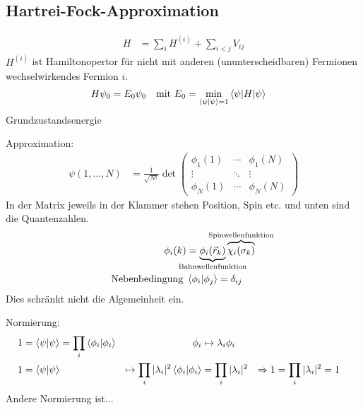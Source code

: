 \subsection{Hartrei-Fock-Approximation}
	\begin{align*}
		H &= \sum_i H^{(i)} + \sum_{i<j} V_{ij}
	\end{align*}
$H^{(i)}$ ist Hamiltonopertor für nicht mit anderen (ununterscheidbaren) Fermionen wechselwirkendes Fermion $i$.
	\begin{align*}
		H \psi_0 &= E_0 \psi_0 
		&\text{mit } E_0 &= \underset{\braket{\psi | \psi} = 1}{\mathrm{min}} \braket{\psi | H | \psi}
	\end{align*}
Grundzustandsenergie

Approximation:
	\begin{align*}
		\psi (1, \ldots, N) 
		&= \frac{1}{\sqrt{N!}} \det 
		\begin{pmatrix}
		\phi_{1}(1) & \cdots & \phi_{1}(N) \\
		\vdots & \ddots & \vdots\\
		\phi_{N}(1) & \cdots & \phi_{N}(N)
		\end{pmatrix} 
	\end{align*}
In der Matrix jeweils in der Klammer stehen Position, Spin etc. und unten sind die Quantenzahlen.
	\begin{align*}
		\phi_i (k) &=
		\underbrace{\phi_i (\vec{r}_k)}_{\mathclap{\text{Bahnwellenfunktion}}}
		\overbrace{\chi_i (\sigma_k)}^{\mathclap{\text{Spinwellenfunktion}}} \\
		\text{Nebenbedingung } &\braket{\phi_i | \phi_j} = \delta_{ij}
	\end{align*}
Dies schränkt nicht die Algemeinheit ein.

Normierung:
	\begin{align*}
		1 &= \braket{\psi | \psi} = \prod_i \braket{\phi_i | \phi_i} 
		& \phi_i &\mapsto \lambda_i \phi_i \\
		1 &= \braket{\psi | \psi} 
		&\mapsto \prod_i |\lambda_i|^2 \braket{\phi_i | \phi_i} &= \prod_i |\lambda_i|^2
		&\Rightarrow 1 &= \prod_i |\lambda_i|^2 = 1 
	\end{align*}
Andere Normierung ist...